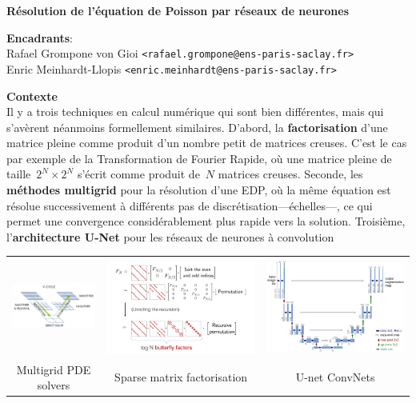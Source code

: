 \documentclass[a4paper,11pt]{article}
\begin{document}
\thispagestyle{empty}

{\bf
	Résolution de l'équation de Poisson par réseaux de neurones
}

{\bf Encadrants}:\\
Rafael Grompone von Gioi \verb+<rafael.grompone@ens-paris-saclay.fr>+\\
Enric Meinhardt-Llopis \verb+<enric.meinhardt@ens-paris-saclay.fr>+

{\bf Contexte}\\
Il y a trois techniques en calcul numérique qui sont bien différentes, mais qui
s'avèrent néanmoins formellement similaires.  D'abord, la {\bf factorisation}
d'une matrice pleine comme produit d'un nombre petit de matrices creuses.
C'est le cas par exemple de la Transformation de Fourier Rapide, où une matrice
pleine de taille~$2^N\times2^N$ s'écrit comme produit de~$N$ matrices creuses.
Seconde, les {\bf méthodes multigrid} pour la résolution d'une EDP, où la même
équation est résolue successivement à différents pas de
discrétisation---échelles---, ce qui permet une convergence considérablement
plus rapide vers la solution.  Troisième, l'{\bf architecture U-Net} pour les
réseaux de neurones à convolution

\begin{tabular}{ccc}
	\includegraphics[width=0.32\linewidth]{f/vcycle.png} &
	\includegraphics[width=0.32\linewidth]{f/butterflies.png} &
	\includegraphics[width=0.32\linewidth]{f/cunet.png} \\
	\sf\color{blue} Multigrid PDE solvers&
	\sf\color{blue} Sparse matrix factorisation &
	\sf\color{blue} U-net ConvNets\\
\end{tabular}
\end{document}
